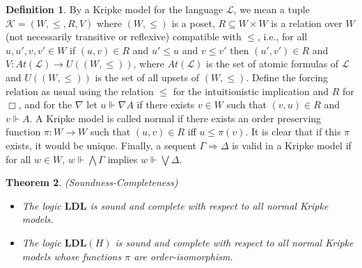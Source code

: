 \documentclass[12pt,a4paper]{article}
\theoremstyle{plain}
\newtheorem{thm}{Theorem}[section]
\theoremstyle{definition}
\newtheorem{dfn}[thm]{Definition}
\begin{document}
\begin{dfn}
By a Kripke model for the language $\mathcal{L}$, we mean a tuple $\mathcal{K}=(W, \leq, R, V)$ where $(W, \leq)$ is a poset, $R \subseteq W \times W$ is a relation over $W$ (not necessarily transitive or reflexive) compatible with $\leq$, i.e., for all $u, u', v, v' \in W$ if $(u, v) \in R$ and $u' \leq u$ and $v \leq v'$ then $(u', v') \in R$ and $V: At(\mathcal{L}) \to U((W, \leq))$, where $At(\mathcal{L})$ is the set of atomic formulas of $\mathcal{L}$ and $U((W, \leq))$ is the set of all upsets of $(W, \leq)$. Define the forcing relation as usual using the relation $\leq$ for the intuitionistic implication and $R$ for $\Box$, and for the $\nabla$ let $u \Vdash \nabla A$ if there exists $v \in W$ such that $(v, u) \in R$ and $v \Vdash A$. A Kripke model is called normal if there exists an order preserving function $\pi : W \to W$ such that $(u, v) \in R$ iff $u \leq \pi(v)$. It is clear that if this $\pi$ exists, it would be unique. Finally, a sequent $\Gamma \Rightarrow \Delta$ is valid in a Kripke model if for all $w \in W$, $w \Vdash \bigwedge \Gamma$ implies $w \Vdash \bigvee \Delta$.
\end{dfn}

\begin{thm}(Soundness-Completeness)
\begin{itemize}
\item[$(i)$]
The logic $\mathbf{LDL}$ is sound and complete with respect to all normal Kripke models.
\item[$(ii)$]
The logic $\mathbf{LDL}(H)$ is sound and complete with respect to all normal Kripke models whose functions $\pi$ are order-isomorphism.
\end{itemize}
\end{thm}
\end{document}

